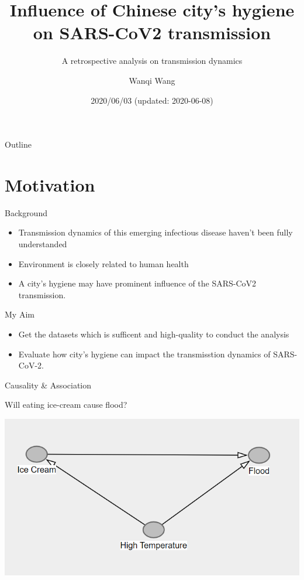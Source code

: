 \documentclass[10pt,ignorenonframetext,aspectratio=169,notes=hide,]{beamer}
\title{Influence of Chinese city's hygiene on SARS-CoV2 transmission}
\subtitle{A retrospective analysis on transmission dynamics}
\author[Wang et al.]{Wanqi Wang}
\institute{Xian Jiaotong-Liverpool University}
\date{2020/06/03 (updated: 2020-06-08)}
\providecommand{\tightlist}{%
  \setlength{\itemsep}{0pt}\setlength{\parskip}{0pt}}
\begin{document}
\frame{\titlepage}

\begin{frame}{Outline}
\tableofcontents
\end{frame}
\hypertarget{motivation}{%
\section{Motivation}\label{motivation}}

\begin{frame}{Background}
\protect\hypertarget{background}{}

\begin{itemize}
\tightlist
\item
  Transmission dynamics of this emerging infectious disease haven't been fully understanded
\item
  Environment is closely related to human health
\item
  A city's hygiene may have prominent influence of the SARS-CoV2 transmission.
\end{itemize}

\end{frame}

\begin{frame}{My Aim}
\protect\hypertarget{my-aim}{}

\begin{itemize}
\item
  Get the datasets which is sufficent and high-quality to conduct the analysis
\item
  Evaluate how city's hygiene can impact the transmisstion dynamics of SARS-CoV-2.
\end{itemize}

\end{frame}

\begin{frame}{Causality \& Association}
\protect\hypertarget{causality-association}{}

Will eating ice-cream cause flood?

\includegraphics[width=1\linewidth]{image/p1}

\end{frame}
\end{document}
